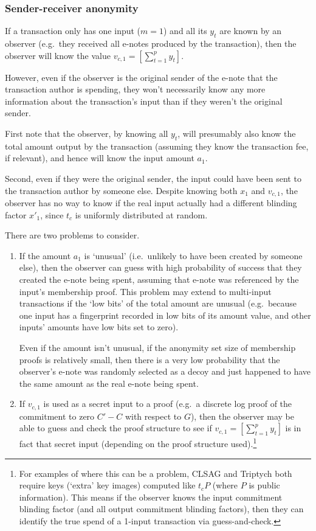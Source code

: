 \subsubsection{Sender-receiver anonymity}
\label{subsubsec:confidential-transactions-sender-receiver-anonymity}

If a transaction only has one input ($m = 1$) and all its $y_t$ are known by an observer (e.g.\ they received all e-notes produced by the transaction), then the observer will know the value $v_{c,1} = [\sum^{p}_{t=1} y_t]$.

However, even if the observer is the original sender of the e-note that the transaction author is spending, they won't necessarily know any more information about the transaction's input than if they weren't the original sender.

First note that the observer, by knowing all $y_t$, will presumably also know the total amount output by the transaction (assuming they know the transaction fee, if relevant), and hence will know the input amount $a_1$.

Second, even if they were the original sender, the input could have been sent to the transaction author by someone else. Despite knowing both $x_1$ and $v_{c,1}$, the observer has no way to know if the real input actually had a different blinding factor $x'_1$, since $t_c$ is uniformly distributed at random.

There are two problems to consider.
\begin{enumerate}
    \item If the amount $a_1$ is `unusual' (i.e.\ unlikely to have been created by someone else), then the observer can guess with high probability of success that they created the e-note being spent, assuming that e-note was referenced by the input's membership proof. This problem may extend to multi-input transactions if the `low bits' of the total amount are unusual (e.g.\ because one input has a fingerprint recorded in low bits of its amount value, and other inputs' amounts have low bits set to zero).

    Even if the amount isn't unusual, if the anonymity set size of membership proofs is relatively small, then there is a very low probability that the observer's e-note was randomly selected as a decoy and just happened to have the same amount as the real e-note being spent.

    \item If $v_{c,1}$ is used as a secret input to a proof (e.g.\ a discrete log proof of the commitment to zero $C' - C$ with respect to $G$), then the observer may be able to guess and check the proof structure to see if $v_{c,1} = [\sum^{p}_{t=1} y_t]$ is in fact that secret input (depending on the proof structure used).\footnote{For examples of where this can be a problem, CLSAG \cite{clsag-eprint} and Triptych \cite{triptych-preprint} both require keys (`extra' key images) computed like $t_c P$ (where $P$ is public information). This means if the observer knows the input commitment blinding factor (and all output commitment blinding factors), then they can identify the true spend of a 1-input transaction via guess-and-check.}
\end{enumerate}


